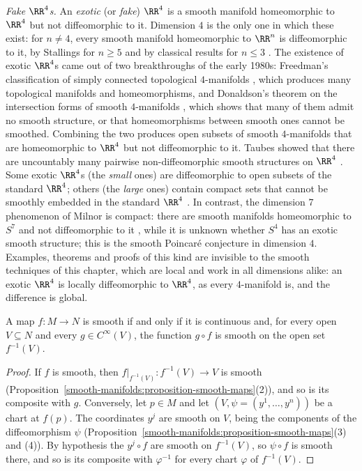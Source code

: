 \begin{remark}\label{smooth-manifolds:remark-fake-r4}
\emph{Fake $\RR^4$s.} An \emph{exotic} (or \emph{fake}) $\RR^4$ is a smooth manifold homeomorphic to $\RR^4$ but not diffeomorphic to it. Dimension $4$ is the only one in which these exist: for $n \neq 4$, every smooth manifold homeomorphic to
$\RR^n$ is diffeomorphic to it, by Stallings for $n \geq 5$ \cite{stallings-1962} and by classical results for $n \leq 3$ \cite{moise-1977}. The existence of exotic $\RR^4$s came out of two breakthroughs of the early
1980s: Freedman's classification of simply connected topological $4$-manifolds \cite{freedman-1982}, which produces many topological manifolds and homeomorphisms, and Donaldson's theorem on the intersection forms of
smooth $4$-manifolds \cite{donaldson-1983}, which shows that many of them admit no smooth structure, or that homeomorphisms between smooth ones cannot be smoothed. Combining the two produces open subsets of
smooth $4$-manifolds that are homeomorphic to $\RR^4$ but not diffeomorphic to it. Taubes showed that there are uncountably many pairwise non-diffeomorphic smooth structures on $\RR^4$ \cite{taubes-1987}.
Some exotic $\RR^4$s (the \emph{small} ones) are diffeomorphic to open subsets of the standard $\RR^4$; others (the \emph{large} ones) contain compact sets that cannot be smoothly embedded in the standard $\RR^4$
\cite{gompf-stipsicz}. In contrast, the dimension $7$ phenomenon of Milnor is compact: there are smooth manifolds homeomorphic to $S^7$ and not diffeomorphic to it \cite{milnor-1956}, while it is unknown whether $S^4$ has an exotic
smooth structure; this is the smooth Poincar\'e conjecture in dimension $4$. Examples, theorems and proofs of this kind are invisible to the smooth techniques of this chapter, which are local and work in all
dimensions alike: an exotic $\RR^4$ is locally diffeomorphic to $\RR^4$, as every $4$-manifold is, and the difference is global.
\end{remark}

\begin{proposition}\label{smooth-manifolds:proposition-pullback-criterion}
A map $f \colon M \to N$ is smooth if and only if it is continuous and, for every open $V \subseteq N$ and every $g \in C^\infty(V)$, the function $g \circ f$
is smooth on the open set $f^{-1}(V)$.
\end{proposition}

\begin{proof}
If $f$ is smooth, then $f|_{f^{-1}(V)} \colon f^{-1}(V) \to V$ is smooth (Proposition~\ref{smooth-manifolds:proposition-smooth-maps}(2)), and so is its
composite with $g$. Conversely, let $p \in M$ and let $(V, \psi = (y^1, \ldots, y^n))$ be a chart at $f(p)$. The coordinates $y^j$ are smooth on $V$, being the
components of the diffeomorphism $\psi$ (Proposition~\ref{smooth-manifolds:proposition-smooth-maps}(3) and (4)). By hypothesis the $y^j \circ f$ are smooth on
$f^{-1}(V)$, so $\psi \circ f$ is smooth there, and so is its composite with $\varphi^{-1}$ for every chart $\varphi$ of $f^{-1}(V)$.
\end{proof}

